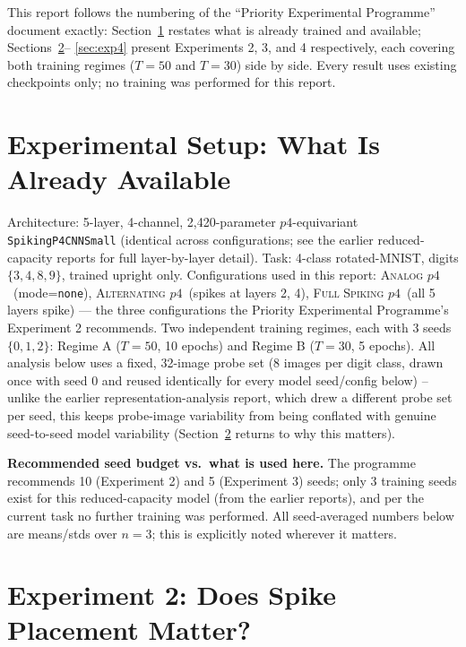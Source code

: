 \documentclass[11pt]{article}
\newcommand{\None}{\textsc{Analog $p4$}}
\newcommand{\Alternating}{\textsc{Alternating $p4$}}
\newcommand{\FullSpiking}{\textsc{Full Spiking $p4$}}
\begin{document}
This report follows the numbering of the ``Priority Experimental Programme'' document exactly:
Section~\ref{sec:setup} restates what is already trained and available; Sections~\ref{sec:exp2}--
\ref{sec:exp4} present Experiments 2, 3, and 4 respectively, each covering both training regimes
($T{=}50$ and $T{=}30$) side by side. Every result uses existing checkpoints only; no training was
performed for this report.

\section{Experimental Setup: What Is Already Available}
\label{sec:setup}

\begin{keypoint}
Architecture: 5-layer, 4-channel, 2{,}420-parameter $p4$-equivariant \texttt{SpikingP4CNNSmall}
(identical across configurations; see the earlier reduced-capacity reports for full layer-by-layer
detail). Task: 4-class rotated-MNIST, digits $\{3,4,8,9\}$, trained upright only. Configurations used
in this report: \None\ (mode=\texttt{none}), \Alternating\ (spikes at layers 2, 4), \FullSpiking\
(all 5 layers spike) --- the three configurations the Priority Experimental Programme's Experiment 2
recommends. Two independent training regimes, each with 3 seeds $\{0,1,2\}$: Regime A ($T{=}50$, 10
epochs) and Regime B ($T{=}30$, 5 epochs). All analysis below uses a fixed, 32-image probe set
(8 images per digit class, drawn once with seed 0 and reused identically for every model seed/config
below) -- unlike the earlier representation-analysis report, which drew a different probe set per
seed, this keeps probe-image variability from being conflated with genuine seed-to-seed model
variability (Section~\ref{sec:exp2} returns to why this matters).
\end{keypoint}

\noindent \textbf{Recommended seed budget vs.\ what is used here.} The programme recommends 10
(Experiment 2) and 5 (Experiment 3) seeds; only 3 training seeds exist for this reduced-capacity model
(from the earlier reports), and per the current task no further training was performed. All
seed-averaged numbers below are means/stds over $n=3$; this is explicitly noted wherever it matters.

\section{Experiment 2: Does Spike Placement Matter?}
\label{sec:exp2}
\end{document}
